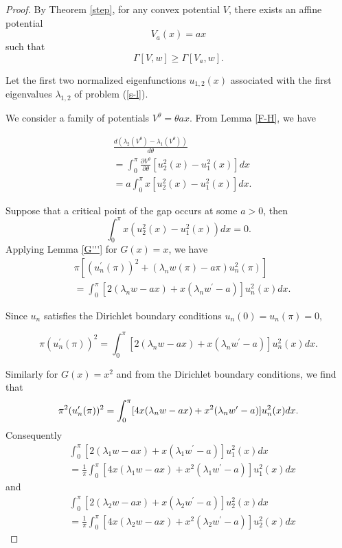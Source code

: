 \documentclass[10pt,a4paper]{amsart}
\begin{document}
\begin{proof}  
By Theorem \ref{step}, for any convex potential $V$, there exists an affine potential
\[
V_a(x) = ax 
\]
such that
\[
\Gamma[V,w] \geq \Gamma[V_a,w].
\]


\noindent Let the first two normalized eigenfunctions $u_{1,2}(x)$ associated with the first eigenvalues $\lambda_{1,2}$ of problem (\ref{s-l}). 

\noindent We consider a family of potentials $V^{\theta}=\theta ax$. 
 From Lemma \ref{F-H}, we have
 

\begin{align*}
&\frac{d(\lambda_2(V^{\theta})-\lambda_1(V^{\theta}))}{d\theta}\\
&=\int_0^{\pi} \frac{\partial V^{\theta}}{\partial \theta}[u_2^2(x)-u_1^2(x)]dx\\
 &=a\int_0^{\pi}x[u_2^2(x)-u_1^2(x)]dx.
\end{align*}
 

\noindent Suppose that a critical point of the gap occurs
at some $a>0$, then
$$
\int_0^{\pi}x(u_2^2(x)-u_1^2(x))dx =0.
$$
\noindent Applying Lemma \ref{G'''} for $G(x)=x$, we have
\begin{align*}
&\pi[(u_n^{\prime}(\pi))^{2}+(\lambda_n w(\pi)-a\pi )u_n^{2}(\pi)]\\
 &=\int_0^\pi [2(\lambda_n w-ax)+x(\lambda_n w^{\prime}-a)]u_n^2
(x)dx.
\end{align*}

\noindent Since $u_n$ satisfies the Dirichlet boundary conditions $u_n(0)=u_n(\pi)=0$, 

$$\pi(u_n^{\prime}(\pi))^{2}
 =\int_0^\pi [2(\lambda_n w-ax)+x(\lambda_n w^{\prime}-a)]u_n^2
(x)dx.
$$ 

\noindent Similarly for $G(x)=x^2$ and from the Dirichlet boundary conditions, we find that
$$\pi^2(u_n^{\prime}(\pi))^{2}\\
=\int_0^\pi [4x(\lambda_n w-ax)+x^2(\lambda_n w^{\prime}-a)]u_n^2(x)dx.$$
\noindent Consequently
\begin{align*}
&\int_0^\pi [2(\lambda_1 w-ax)+x(\lambda_1 w^{\prime}-a)]u_1^2
(x)dx\\
&=\frac{1}{\pi}\int_0^\pi [4x(\lambda_1 w-ax)+x^2(\lambda_1 w^{\prime}-a)]u_1^2(x)dx
\end{align*}
\noindent and
\begin{align*}
&\int_0^\pi [2(\lambda_2 w-ax)+x(\lambda_2 w^{\prime}-a)]u_2^2
(x)dx\\
&=\frac{1}{\pi}\int_0^\pi [4x(\lambda_2 w-ax)+x^2(\lambda_2 w^{\prime}-a)]u_2^2(x)dx
\end{align*}






\end{proof}
\end{document}
